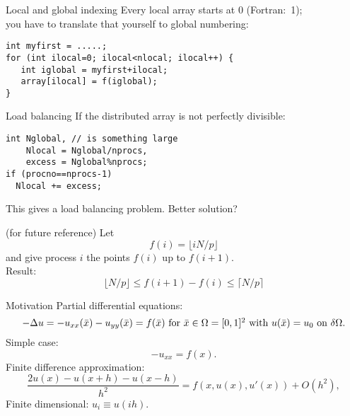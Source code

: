 \begin{numberedframe}{Local and global indexing}
  Every local array starts at 0 (Fortran:~1);\\
  you have to translate that yourself to global numbering:
\lstset{language=C}
\begin{lstlisting}
int myfirst = .....;
for (int ilocal=0; ilocal<nlocal; ilocal++) {
   int iglobal = myfirst+ilocal;
   array[ilocal] = f(iglobal);
}  
\end{lstlisting}
\end{numberedframe}

\begin{optexerciseframe}
  
\end{optexerciseframe}

\begin{numberedframe}{Load balancing}
If the distributed array is not perfectly divisible:
\lstset{language=C}
\begin{lstlisting}
int Nglobal, // is something large
    Nlocal = Nglobal/nprocs,
    excess = Nglobal%nprocs;
if (procno==nprocs-1) 
  Nlocal += excess;
\end{lstlisting}
This gives a load balancing problem. Better solution?
\end{numberedframe}

\begin{numberedframe}{(for future reference)}
Let
\[ f(i)=\lfloor iN/p\rfloor \]
and give process $i$ the points $f(i)$ up to $f(i+1)$. \\
Result:
\[ \lfloor N/p\rfloor \leq f(i+1)-f(i)\leq \lceil N/p\rceil \]
\end{numberedframe}


\begin{numberedframe}{Motivation}
  Partial differential equations:
  \[
    \hbox{$-\Delta u = -u_{xx}(\bar x)-u_{yy}(\bar x)=f(\bar x)$ for
      $\bar x\in\Omega=[0,1]^2$ 
      with $u(\bar x)=u_0$ on $\delta\Omega$.}
    \]
  Simple case:
  \[ -u_{xx}=f(x). \]
  Finite difference approximation:
  \[ \frac{2u(x)-u(x+h)-u(x-h)}{h^2}=f(x,u(x),u'(x))+O(h^2), \]
  Finite dimensional: $u_i\equiv u(ih)$.
\end{numberedframe}

